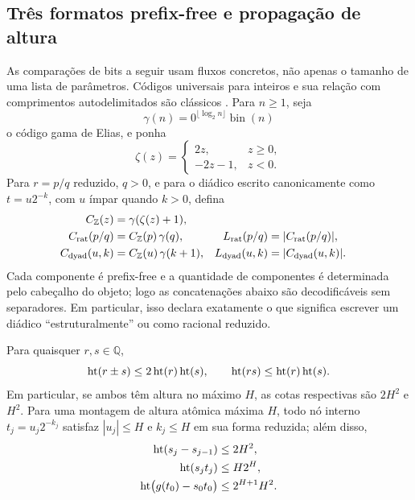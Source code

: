 \subsection{Três formatos prefix-free e propagação de altura}
\label{subsec:coding-formats}

As comparações de bits a seguir usam fluxos concretos, não apenas o tamanho
de uma lista de parâmetros. Códigos universais para inteiros e sua relação
com comprimentos autodelimitados são clássicos
\citep{elias1975,coverthomas2006}. Para $n\ge1$, seja
\[
 \gamma(n)=0^{\lfloor\log_2n\rfloor}\operatorname{bin}(n)
\]
o código gama de Elias, e ponha
\[
 \zeta(z)=\begin{cases}2z,&z\ge0,\\-2z-1,&z<0.
 \end{cases}
\]
Para $r=p/q$ reduzido, $q>0$, e para o diádico escrito canonicamente como
$t=u2^{-k}$, com $u$ ímpar quando $k>0$, defina
\begin{align}
 C_{\mathbb Z}(z)&=\gamma(\zeta(z)+1),\\
 C_{\rm rat}(p/q)&=C_{\mathbb Z}(p)\,\gamma(q),
 &L_{\rm rat}(p/q)&=|C_{\rm rat}(p/q)|,\label{eq:rational-code}\\
 C_{\rm dyad}(u,k)&=C_{\mathbb Z}(u)\,\gamma(k+1),
 &L_{\rm dyad}(u,k)&=|C_{\rm dyad}(u,k)|.
 \label{eq:dyadic-code}
\end{align}
Cada componente é prefix-free e a quantidade de componentes é determinada
pelo cabeçalho do objeto; logo as concatenações abaixo são decodificáveis sem
separadores. Em particular, isso declara exatamente o que significa escrever
um diádico ``estruturalmente'' ou como racional reduzido.

\begin{lemma}
\label{lem:height-arithmetic}
Para quaisquer $r,s\in\mathbb Q$,
\begin{equation}
 \operatorname{ht}(r\pm s)\le2\operatorname{ht}(r)\operatorname{ht}(s),
 \qquad
 \operatorname{ht}(rs)\le\operatorname{ht}(r)\operatorname{ht}(s).
 \label{eq:height-arithmetic}
\end{equation}
Em particular, se ambos têm altura no máximo $H$, as cotas respectivas são
$2H^2$ e $H^2$.
Para uma montagem de altura atômica máxima $H$, todo nó interno
$t_j=u_j2^{-k_j}$ satisfaz $|u_j|\le H$ e $k_j\le H$ em sua forma reduzida;
além disso,
\begin{align}
 \operatorname{ht}(s_j-s_{j-1})&\le2H^2,\label{eq:slope-jump-height}\\
 \operatorname{ht}(s_jt_j)&\le H2^H,\label{eq:slope-knot-height}\\
 \operatorname{ht}\bigl(g(t_0)-s_0t_0\bigr)&\le2^{H+1}H^2.
 \label{eq:intercept-height}
\end{align}
\end{lemma}

